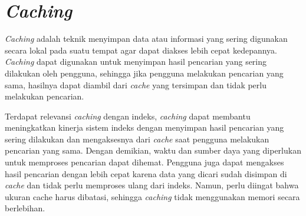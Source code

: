 \section{\textit{Caching}}
\textit{Caching} adalah teknik menyimpan data atau informasi yang sering digunakan secara lokal pada suatu tempat agar dapat diakses lebih cepat kedepannya. \textit{Caching} dapat digunakan untuk menyimpan hasil pencarian yang sering dilakukan oleh pengguna, sehingga jika pengguna melakukan pencarian yang sama, hasilnya dapat diambil dari \textit{cache} yang tersimpan dan tidak perlu melakukan pencarian.

Terdapat relevansi \textit{caching} dengan indeks, \textit{caching} dapat membantu meningkatkan kinerja sistem indeks dengan menyimpan hasil pencarian yang sering dilakukan dan mengaksesnya dari \textit{cache} saat pengguna melakukan pencarian yang sama. Dengan demikian, waktu dan sumber daya yang diperlukan untuk memproses pencarian dapat dihemat. Pengguna juga dapat mengakses hasil pencarian dengan lebih cepat karena data yang dicari sudah disimpan di \textit{cache} dan tidak perlu memproses ulang dari indeks. Namun, perlu diingat bahwa ukuran cache harus dibatasi, sehingga \textit{caching} tidak menggunakan memori secara berlebihan.